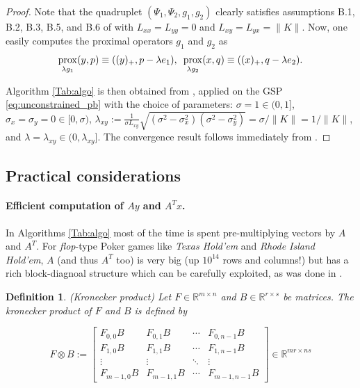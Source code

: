 \documentclass{article} %
\newtheorem{definition}[theorem]{Definition}
\DeclareMathOperator{\prox}{prox}
\begin{document}
\begin{proof}
Note that the quadruplet $(\Psi_1, \Psi_2, g_1, g_2)$ clearly satisfies
assumptions B.1, B.2, B.3, B.5, and B.6 of \cite{he2013accelerating}
with $L_{xx} = L_{yy} = 0$ and $L_{xy} = L_{yx} = \|K\|$. Now,
one easily computes the proximal operators $g_1$ and $g_2$ as
\begin{eqnarray}
  \prox_{\lambda g_1}(y, p) \equiv ((y)_+, p - \lambda
  e_1),\hspace{.5em} \prox_{\lambda g_2}(x, q) \equiv ((x)_+, q -
  \lambda e_2).
  \end{eqnarray}

Algorithm \ref{Tab:algo} is then obtained from \cite[Algorithm
  T-BD]{he2013accelerating}, applied on the GSP
\eqref{eq:unconstrained_pb} with the choice of parameters: $\sigma = 1
\in (0, 1]$, $\sigma_x = \sigma_y = 0 \in [0, \sigma)$,
    $\lambda_{xy} := \frac{1}{\sigma L_{xy}}\sqrt{(\sigma^2 -
        \sigma_x^2)(\sigma^2 - \sigma_y^2)} = \sigma / \|K\| =
      1/\|K\|$, and $\lambda = \lambda_{xy} \in (0,
      \lambda_{xy}]$. The convergence result follows immediately from
  \cite[Theorem 4.2]{he2013accelerating}.
\end{proof}

\subsection{Practical considerations}
\paragraph{\textbf{Efficient computation of $Ay$ and $A^Tx$.}}
In Algorithms \ref{Tab:algo} most of the time is spent
pre-multiplying vectors by $A$ and $A^T$. For \textit{flop}-type Poker
games like \textit{Texas Hold'em} and  \textit{Rhode Island Hold'em},
$A$ (and thus $A^T$ too)  is very big (up $10^{14}$ rows and columns!)
but has a rich block-diagnoal structure which can be carefully
exploited, as was done in \cite{hoda2010smoothing}.


\begin{definition}(Kronecker product)
Let $F \in \mathbb{R}^{m \times n}$ and $B \in \mathbb{R}^{r \times
  s}$ be matrices. The kronecker product of $F$ and $B$ is defined by

\begin{equation}
F \otimes B:=\left[
\begin{array}{cccc}
F_{0,0}B & F_{0,1}B & \cdots & F_{0,n-1}B \\
F_{1,0}B & F_{1,1}B & \cdots & F_{1,n-1}B \\
\vdots & \vdots & \ddots & \vdots\\
F_{m-1,0}B & F_{m-1,1}B & \cdots & F_{m-1,n-1}B 
\end{array}\right] \in \mathbb{R}^{mr \times ns}
\end{equation}
\end{definition}
\end{document}

